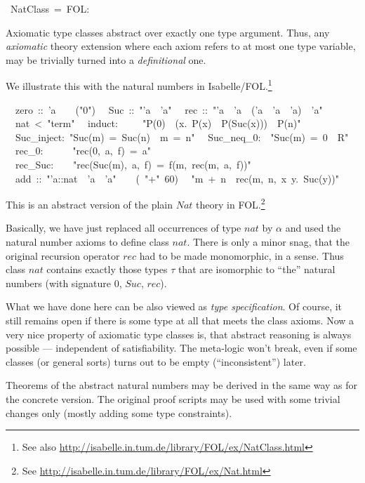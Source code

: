 \begin{isabelle}%
%
~NatClass~=~FOL:%
\begin{isamarkuptext}%
\medskip\noindent Axiomatic type classes abstract over exactly one
 type argument. Thus, any \emph{axiomatic} theory extension where each
 axiom refers to at most one type variable, may be trivially turned
 into a \emph{definitional} one.

 We illustrate this with the natural numbers in
 Isabelle/FOL.\footnote{See also
 \url{http://isabelle.in.tum.de/library/FOL/ex/NatClass.html}}%
\end{isamarkuptext}%
\isanewline
~~zero~::~'a~~~~({"}0{"})\isanewline
~~Suc~::~{"}'a~{\isasymRightarrow}~'a{"}\isanewline
~~rec~::~{"}'a~{\isasymRightarrow}~'a~{\isasymRightarrow}~('a~{\isasymRightarrow}~'a~{\isasymRightarrow}~'a)~{\isasymRightarrow}~'a{"}\isanewline
\isanewline
{}\isanewline
~~nat~<~{"}term{"}\isanewline
~~induct:~~~~~{"}P(0)~{\isasymLongrightarrow}~({\isasymAnd}x.~P(x)~{\isasymLongrightarrow}~P(Suc(x)))~{\isasymLongrightarrow}~P(n){"}\isanewline
~~Suc\_inject:~{"}Suc(m)~=~Suc(n)~{\isasymLongrightarrow}~m~=~n{"}\isanewline
~~Suc\_neq\_0:~~{"}Suc(m)~=~0~{\isasymLongrightarrow}~R{"}\isanewline
~~rec\_0:~~~~~~{"}rec(0,~a,~f)~=~a{"}\isanewline
~~rec\_Suc:~~~~{"}rec(Suc(m),~a,~f)~=~f(m,~rec(m,~a,~f)){"}\isanewline
\isanewline
{}\isanewline
~~add~::~{"}'a::nat~{\isasymRightarrow}~'a~{\isasymRightarrow}~'a{"}~~~~(~{"}+{"}~60)\isanewline
~~{"}m~+~n~{\isasymequiv}~rec(m,~n,~{\isasymlambda}x~y.~Suc(y)){"}%
\begin{isamarkuptext}%
This is an abstract version of the plain $Nat$ theory in
 FOL.\footnote{See
 \url{http://isabelle.in.tum.de/library/FOL/ex/Nat.html}}

 Basically, we have just replaced all occurrences of type $nat$ by
 $\alpha$ and used the natural number axioms to define class $nat$.
 There is only a minor snag, that the original recursion operator
 $rec$ had to be made monomorphic, in a sense.  Thus class $nat$
 contains exactly those types $\tau$ that are isomorphic to ``the''
 natural numbers (with signature $0$, $Suc$, $rec$).

 \medskip What we have done here can be also viewed as \emph{type
 specification}.  Of course, it still remains open if there is some
 type at all that meets the class axioms.  Now a very nice property of
 axiomatic type classes is, that abstract reasoning is always possible
 --- independent of satisfiability.  The meta-logic won't break, even
 if some classes (or general sorts) turns out to be empty
 (``inconsistent'') later.

 Theorems of the abstract natural numbers may be derived in the same
 way as for the concrete version.  The original proof scripts may be
 used with some trivial changes only (mostly adding some type
 constraints).%
\end{isamarkuptext}%
\end{isabelle}%
